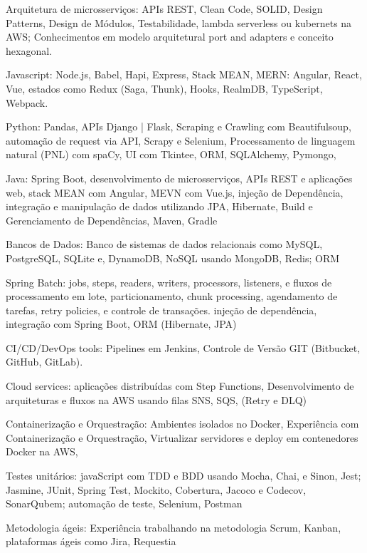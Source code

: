 \documentclass[a4paper,10pt]{article}
\begin{document}
\textcolor{corSubSection}{Arquitetura de microsserviços:}
APIs REST, Clean Code, SOLID, Design Patterns, Design de Módulos, Testabilidade, lambda serverless ou kubernets na AWS; Conhecimentos em modelo arquitetural port and adapters e conceito hexagonal.

\textcolor{corSubSection}{Javascript:}
Node.js, Babel, Hapi, Express, Stack MEAN, MERN: Angular, React, Vue, estados como Redux (Saga, Thunk), Hooks, RealmDB, TypeScript, Webpack.

\textcolor{corSubSection}{Python:}
Pandas, APIs Django | Flask, Scraping e Crawling com Beautifulsoup, automação de request via API, Scrapy e Selenium, Processamento de linguagem natural (PNL) com spaCy, UI com Tkintee, ORM, SQLAlchemy, Pymongo,

\textcolor{corSubSection}{Java:}
Spring Boot, desenvolvimento de microsserviços, APIs REST e aplicações web, stack MEAN com Angular, MEVN com Vue.js, injeção de Dependência, integração e manipulação de dados utilizando JPA, Hibernate, Build e Gerenciamento de Dependências, Maven, Gradle

\textcolor{corSubSection}{Bancos de Dados:}
Banco de sistemas de dados relacionais como MySQL, PostgreSQL, SQLite e, DynamoDB, NoSQL usando MongoDB, Redis; ORM

\textcolor{corSubSection}{Spring Batch:}
jobs, steps, readers, writers, processors, listeners, e fluxos de processamento em lote, particionamento, chunk processing, agendamento de tarefas, retry policies, e controle de transações. injeção de dependência, integração com Spring Boot, ORM (Hibernate, JPA)

\textcolor{corSubSection}{CI/CD/DevOps tools:}
Pipelines em Jenkins, Controle de Versão GIT (Bitbucket, GitHub, GitLab).

\textcolor{corSubSection}{Cloud services:}
aplicações distribuídas com Step Functions, Desenvolvimento de arquiteturas e fluxos na AWS usando filas SNS, SQS, (Retry e DLQ)

\textcolor{corSubSection}{Containerização e Orquestração:}
Ambientes isolados no Docker, Experiência com Containerização e Orquestração, Virtualizar servidores e deploy em contenedores Docker na AWS,

\textcolor{corSubSection}{Testes unitários:}
javaScript com TDD e BDD usando Mocha, Chai, e Sinon, Jest; Jasmine, JUnit, Spring Test, Mockito, Cobertura, Jacoco e Codecov, SonarQubem; automação de teste, Selenium, Postman

\textcolor{corSubSection}{Metodologia ágeis:}
Experiência trabalhando na metodologia Scrum, Kanban, plataformas ágeis como Jira, Requestia
\end{document}
